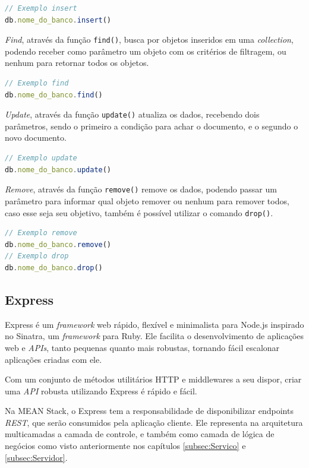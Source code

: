 \documentclass[
	12pt,				%
	openright,			%
	twoside,			%
	a4paper,			%
	english,			%
	brazil				%
	]{abntex2}
\begin{document}
\begin{lstlisting}[language=javascript]
// Exemplo insert
db.nome_do_banco.insert()
\end{lstlisting}

\textit{Find}, através da função \verb|find()|, busca por objetos inseridos em uma \textit{collection}, podendo receber como parâmetro um objeto com os critérios de filtragem, ou nenhum para retornar todos os objetos.
 
\begin{lstlisting}[language=javascript]
// Exemplo find
db.nome_do_banco.find()
\end{lstlisting}

\textit{Update}, através da função \verb|update()| atualiza os dados, recebendo dois parâmetros, sendo o primeiro a condição para achar o documento, e o segundo o novo documento.

\begin{lstlisting}[language=javascript]
// Exemplo update
db.nome_do_banco.update()
\end{lstlisting}

\textit{Remove}, através da função \verb|remove()| remove os dados, podendo passar um parâmetro para informar qual objeto remover ou nenhum para remover todos, caso esse seja seu objetivo, também é possível utilizar o comando \verb|drop()|.

\begin{lstlisting}[language=javascript]
// Exemplo remove
db.nome_do_banco.remove()
// Exemplo drop
db.nome_do_banco.drop()
\end{lstlisting}


\subsection{Express}

Express é um \textit{framework} web rápido, flexível e minimalista para Node.js inspirado no Sinatra, um \textit{framework} para Ruby. Ele facilita o desenvolvimento de aplicações web e \textit{APIs}, tanto pequenas quanto mais robustas, tornando fácil escalonar aplicações criadas com ele.

Com um conjunto de métodos utilitários HTTP e middlewares a seu dispor, criar uma \textit{API} robusta utilizando Express é rápido e fácil.

Na MEAN Stack, o Express tem a responsabilidade de disponibilizar endpoints \textit{REST}, que serão consumidos pela aplicação cliente. Ele representa na arquitetura multicamadas a camada de controle, e também como camada de lógica de negócios como visto anteriormente nos capítulos \ref{subsec:Servico} e \ref{subsec:Servidor}.
\end{document}
